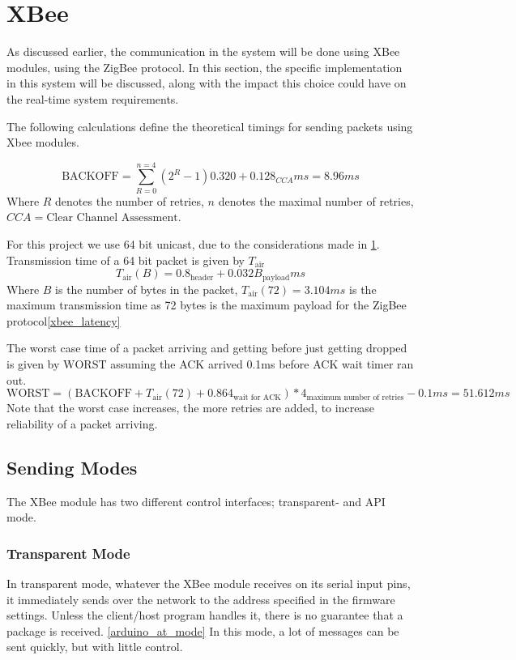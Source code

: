 \section{XBee}\label{sec:xbee}
As discussed earlier, the communication in the system will be done using XBee modules, using the ZigBee protocol. In this section, the specific implementation in this system will be discussed, along with the impact this choice could have on the real-time system requirements.

The following calculations define the theoretical timings for sending packets using Xbee modules.

\begin{equation*}
\text{BACKOFF} = \sum\limits_{R=0}^{n=4}(2^{R} - 1) 0.320 + 0.128_{CCA} ms = 8.96 ms
\end{equation*}
Where $R$ denotes the number of retries, $n$ denotes the maximal number of retries, $CCA = \text{Clear Channel Assessment}$.

For this project we use 64 bit unicast, due to the considerations made in \cref{sec:xbee}.
Transmission time of a 64 bit packet is given by $T_{\text{air}}$
\begin{equation*}
T_{\text{air}}(B) = 0.8_{\text{header}} + 0.032B_{\text{payload}} ms
\end{equation*}
Where $B$ is the number of bytes in the packet, $T_{\text{air}}(72) = 3.104 ms$ is the maximum transmission time as 72 bytes is the maximum payload for the ZigBee protocol\cref{xbee_latency}

The worst case time of a packet arriving and getting before just getting dropped is given by $\text{WORST}$ assuming the ACK arrived 0.1ms before ACK wait timer ran out.
\begin{equation*}
\text{WORST} = (\text{BACKOFF} + T_{\text{air}}(72) + 0.864_{\text{wait for ACK}})*4_{\text{maximum number of retries}} - 0.1 ms = 51.612 ms
\end{equation*}
Note that the worst case increases, the more retries are added, to increase reliability of a packet arriving.

\subsection{Sending Modes}
The XBee module has two different control interfaces; transparent- and API mode.
\subsubsection{Transparent Mode}
In transparent mode, whatever the XBee module receives on its serial input pins, it immediately sends over the network to the address specified in the firmware settings. Unless the client/host program handles it, there is no guarantee that a package is received. \cref{arduino_at_mode}
In this mode, a lot of messages can be sent quickly, but with little control.

